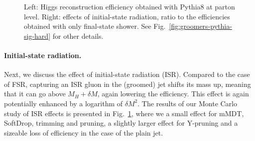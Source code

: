 \begin{figure}[t!]
  \hfill%
  \caption{Left: Higgs reconstruction efficiency obtained with Pythia8
    at parton level. Right: effects of initial-state radiation, \ie
    ratio to the efficiencies obtained with only final-state
    shower. See Fig.~\ref{fig:groomers-pythia-sig-hard} for other
    details.}\label{fig:groomers-pythia-sig-isr}
\end{figure}

\paragraph{Initial-state radiation.}
%
Next, we discuss the effect of initial-state radiation
(ISR). Compared to the case of FSR, capturing an ISR gluon in the
(groomed) jet shifts its mass up, meaning that it can go above
$M_H+\delta M$, again lowering the efficiency.
%
This effect is again potentially enhanced by a logarithm of
$\delta M^2$.
%
The results of our Monte Carlo study of ISR effects is presented in
Fig.~\ref{fig:groomers-pythia-sig-isr}, where we a small effect for
mMDT, SoftDrop, trimming and pruning, a slightly larger effect for
Y-pruning and a sizeable loss of efficiency in the case of the plain
jet.

